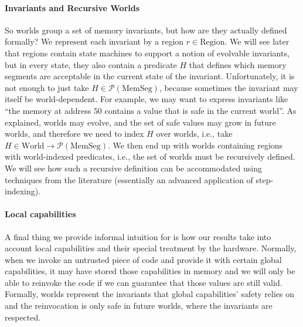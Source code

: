 \documentclass[format=acmsmall, review=false, screen=true]{acmart}
\newcommand{\powerset}[1]{\mathcal{P}(#1)}
\newcommand{\plaindom}[1]{\mathrm{#1}}
\newcommand{\HeapSegments}{\plaindom{MemSeg}}
\newcommand{\MemSegments}{\HeapSegments}
\newcommand{\Regions}{\plaindom{Region}}
\newcommand{\Worlds}{\plaindom{World}}
\newenvironment{toplas}
    {\color{OliveGreen}
          
    }{}
\begin{document}
\begin{toplas}
\paragraph{Invariants and Recursive Worlds}
So worlds group a set of memory invariants, but how are they actually
defined formally? We represent each invariant by a region
$r \in \Regions$. We will see later that regions contain state
machines to support a notion of evolvable invariants, but in every
state, they also contain a predicate $H$ that defines which memory
segments are acceptable in the current state of the invariant.
Unfortunately, it is not enough to just take
$H \in \powerset{\MemSegments}$, because sometimes the invariant may
itself be world-dependent. For example, we may want to express
invariants like ``the memory at address $50$ contains a value that is
safe in the current world''. As explained, worlds may evolve, and the
set of safe values may grow in future worlds, and therefore we need to
index $H$ over worlds, i.e., take
$H \in \Worlds \rightarrow \powerset{\MemSegments}$. We then end up
with worlds containing regions with world-indexed predicates,
i.e., the set of worlds must be recursively defined. We will see how such a recursive
definition can be accommodated using techniques from the
literature (essentially an advanced application of step-indexing).

\paragraph{Local capabilities}
A final thing we provide informal intuition for is how our results take into account local
capabilities and their special treatment by the hardware. Normally, when we
invoke an untrusted piece of code and provide it with certain global
capabilities, it may have stored those capabilities in memory and we will only
be able to reinvoke the code if we can guarantee that those values are still
valid. Formally, worlds represent the invariants that global capabilities'
safety relies on and the reinvocation is only safe in future worlds, where the
invariants are respected.


\end{toplas}
\end{document}
